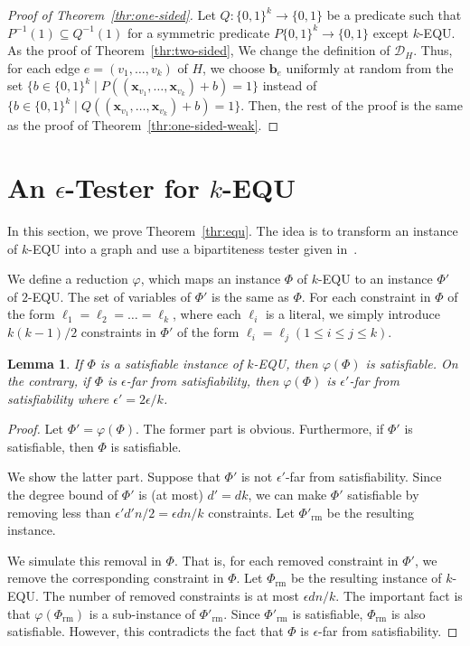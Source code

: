 \documentclass[letterpaper,11pt]{article}
\newtheorem{lemma}[theorem]{Lemma}
\newcommand{\cald}{\mathcal{D}}
\newcommand{\bfx}{\mathbf{x}}
\newcommand{\bfb}{\mathbf{b}}
\newcommand{\bit}{\{0,1\}}
\newcommand{\equ}{\textsf{EQU}\xspace}
\newcommand{\kequ}{$k$-\textsf{EQU}\xspace}
\begin{document}
\begin{proof}[Proof of Theorem~\ref{thr:one-sided}]
  Let $Q:\bit^k\to\bit$ be a predicate such that $P^{-1}(1)\subseteq Q^{-1}(1)$ for a symmetric predicate $P\bit^k\to\bit$ except \kequ.
  As the proof of Theorem~\ref{thr:two-sided},
  We change the definition of $\cald_H$.  
  Thus, 
  for each edge $e=(v_1,\ldots,v_k)$ of $H$,
  we choose $\bfb_e$ uniformly at random from the set $\{b\in \bit^k\mid P((\bfx_{v_1},\ldots,\bfx_{v_k})+b)=1 \}$ instead of $\{b\in \bit^k\mid Q((\bfx_{v_1},\ldots,\bfx_{v_k})+b)=1 \}$.
  Then, the rest of the proof is the same as the proof of Theorem~\ref{thr:one-sided-weak}.
\end{proof}

\section{An $\epsilon$-Tester for \kequ}\label{apx:equ}
In this section, we prove Theorem~\ref{thr:equ}.
The idea is to transform an instance of \kequ into a graph and use a bipartiteness tester given in~\cite{GR99}.

We define a reduction $\varphi$, which maps an instance $\Phi$ of \kequ to an instance $\Phi'$ of $2$-\equ.
The set of variables of $\Phi'$ is the same as $\Phi$.
For each constraint in $\Phi$ of the form $\ell_1=\ell_2=\ldots=\ell_k$,
where each $\ell_i$ is a literal,
we simply introduce $k(k-1)/2$ constraints in $\Phi'$ of the form $\ell_i=\ell_j (1\leq i \leq j \leq k)$.

\begin{lemma}\label{lmm:reduction-from-keq}
  If $\Phi$ is a satisfiable instance of \kequ,
  then $\varphi(\Phi)$ is satisfiable.
  On the contrary, if $\Phi$ is $\epsilon$-far from satisfiability,
  then $\varphi(\Phi)$ is $\epsilon'$-far from satisfiability where $\epsilon'=2\epsilon/k$.
\end{lemma}
\begin{proof}
  Let $\Phi'=\varphi(\Phi)$.
  The former part is obvious.
  Furthermore, if $\Phi'$ is satisfiable, then $\Phi$ is satisfiable.

  We show the latter part.
  Suppose that $\Phi'$ is not $\epsilon'$-far from satisfiability.
  Since the degree bound of $\Phi'$ is (at most) $d'=dk$,
  we can make $\Phi'$ satisfiable by removing less than $\epsilon' d'n/2=\epsilon dn / k$ constraints.
  Let $\Phi'_{\textrm{rm}}$ be the resulting instance.

  We simulate this removal in $\Phi$.
  That is, for each removed constraint in $\Phi'$,
  we remove the corresponding constraint in $\Phi$.
  Let $\Phi_{\textrm{rm}}$ be the resulting instance of \kequ.
  The number of removed constraints is at most $\epsilon dn/k$.
  The important fact is that $\varphi(\Phi_{\textrm{rm}})$ is a sub-instance of $\Phi'_{\textrm{rm}}$.
  Since $\Phi'_{\textrm{rm}}$ is satisfiable, 
  $\Phi_{\textrm{rm}}$ is also satisfiable.
  However, this contradicts the fact that $\Phi$ is $\epsilon$-far from satisfiability.
\end{proof}
\end{document}
